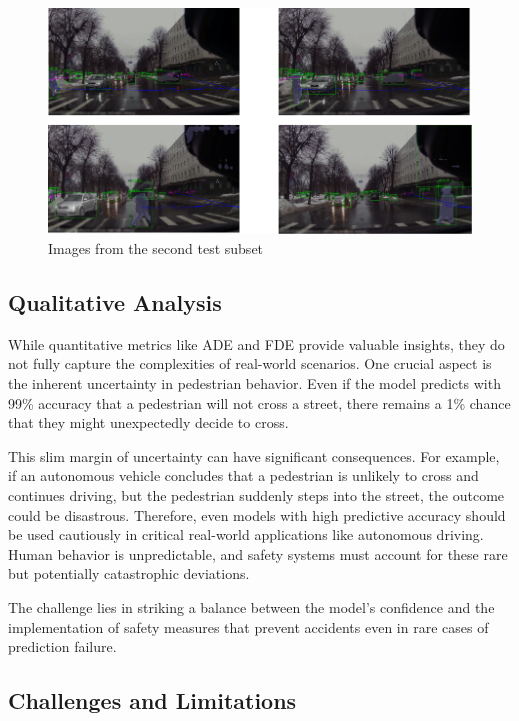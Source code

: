 \begin{figure}[h]
  \begin{center}
     \includegraphics[scale=0.5]{Images/Figures/sequenceofimages.png}
  \end{center}
  \caption{Images from the second test subset}
  \label{fig:testimages}
\end{figure}



\subsection{Qualitative Analysis}

\tab While quantitative metrics like ADE and FDE provide valuable insights, they do not fully capture the complexities of real-world scenarios. One crucial aspect is the inherent uncertainty in pedestrian behavior. Even if the model predicts with 99\% accuracy that a pedestrian will not cross a street, there remains a 1\% chance that they might unexpectedly decide to cross.

\tab This slim margin of uncertainty can have significant consequences. For example, if an autonomous vehicle concludes that a pedestrian is unlikely to cross and continues driving, but the pedestrian suddenly steps into the street, the outcome could be disastrous. Therefore, even models with high predictive accuracy should be used cautiously in critical real-world applications like autonomous driving. Human behavior is unpredictable, and safety systems must account for these rare but potentially catastrophic deviations.

\tab The challenge lies in striking a balance between the model's confidence and the implementation of safety measures that prevent accidents even in rare cases of prediction failure.

\subsection{Challenges and Limitations}


